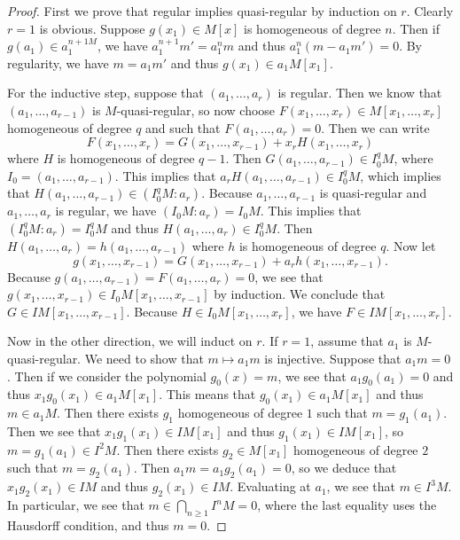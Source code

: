 \documentclass[leqno, openany]{memoir}
\theoremstyle{definition}
\theoremstyle{remark}
\theoremstyle{plain}
\theoremstyle{definition}
\theoremstyle{remark}
\begin{document}
\begin{proof}
    First we prove that regular implies quasi-regular by induction on $r$. Clearly $r=1$ is obvious. Suppose $g(x_1) \in M[x]$ is homogeneous of degree $n$. Then if $g(a_1) \in a_1^{n+1M}$, we have $a_1^{n+1}m' = a_1^n m$ and thus $a_1^n(m-a_1 m') = 0$. By regularity, we have $m = a_1 m'$ and thus $g(x_1) \in a_1 M[x_1]$.

    For the inductive step, suppose that $(a_1, \ldots, a_r)$ is regular. Then we know that $(a_1, \ldots, a_{r-1})$ is $M$-quasi-regular, so now choose $F(x_1, \ldots, x_r) \in M[x_1, \ldots, x_r]$ homogeneous of degree $q$ and such that $F(a_1, \ldots, a_r) = 0$. Then we can write
    \[ F(x_1, \ldots, x_r) = G(x_1, \ldots, x_{r-1}) + x_r H(x_1, \ldots, x_r) \]
    where $H$ is homogeneous of degree $q-1$. Then $G(a_1, \ldots, a_{r-1}) \in I_0^q M$, where $I_0 = (a_1, \ldots, a_{r-1})$. This implies that $a_r H(a_1, \ldots, a_{r-1}) \in I_0^q M$, which implies that $H(a_1, \ldots, a_{r-1}) \in (I_0^q M : a_r)$. Because $a_1, \ldots, a_{r-1}$ is quasi-regular and $a_1, \ldots, a_r$ is regular, we have $(I_0 M : a_r) = I_0 M$. This implies that $(I_0^q M : a_r) = I_0^q M$ and thus $H(a_1, \ldots, a_r) \in I_0^q M$. Then $H(a_1, \ldots, a_r) = h(a_1, \ldots, a_{r-1})$ where $h$ is homogeneous of degree $q$. Now let
    \[ g(x_1, \ldots, x_{r-1}) = G(x_1, \ldots, x_{r-1}) + a_r h(x_1, \ldots, x_{r-1}). \]
    Because $g(a_1, \ldots, a_{r-1}) = F(a_1, \ldots, a_r) = 0$, we see that $g(x_1, \ldots, x_{r-1}) \in I_0 M [ x_1, \ldots, x_{r-1} ]$ by induction. We conclude that $G \in IM[x_1, \ldots, x_{r-1}]$. Because $H \in I_0 M[x_1, \ldots, x_r]$, we have $F \in IM[x_1, \ldots, x_r]$.

    Now in the other direction, we will induct on $r$. If $r=1$, assume that $a_1$ is $M$-quasi-regular. We need to show that $m \mapsto a_1 m$ is injective. Suppose that $a_1 m = 0$. Then if we consider the polynomial $g_0(x) = m$, we see that $a_1 g_0(a_1) = 0$ and thus $x_1 g_0(x_1) \in a_1 M[x_1]$. This means that $g_0(x_1) \in a_1 M[x_1]$ and thus $m \in a_1 M$. Then there exists $g_1$ homogeneous of degree $1$ such that $m = g_1(a_1)$. Then we see that $x_1 g_1(x_1) \in IM[x_1]$ and thus $g_1(x_1) \in IM[x_1]$, so $m = g_1(a_1) \in I^2 M$. Then there exists $g_2 \in M[x_1]$ homogeneous of degree $2$ such that $m = g_2(a_1)$. Then $a_1 m = a_1 g_2(a_1) = 0$, so we deduce that $x_1 g_2(x_1) \in IM$ and thus $g_2(x_1) \in IM$. Evaluating at $a_1$, we see that $m \in I^3 M$. In particular, we see that $m \in \bigcap_{n \geq 1} I^n M = 0$, where the last equality uses the Hausdorff condition, and thus $m = 0$.


\end{proof}
\end{document}
